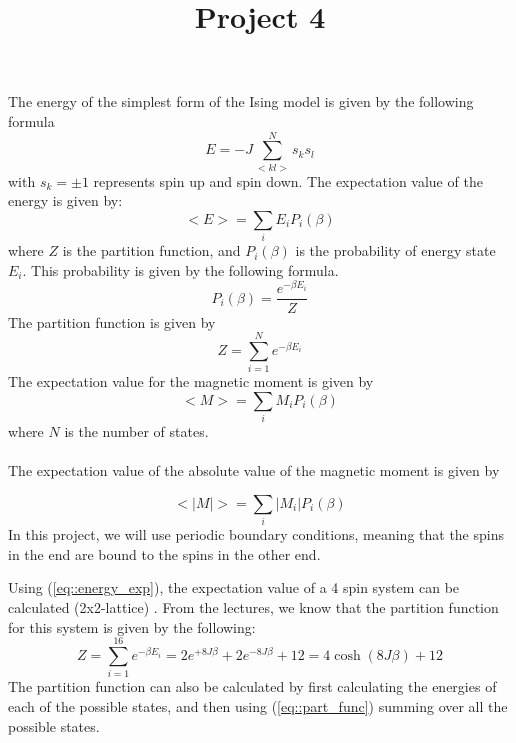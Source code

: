 \documentclass[12pt]{article}
\title{Project 4}
\begin{document}
\maketitle
The energy of the simplest form of the Ising model is given by the following formula
\begin{equation}\label{eq::energy}
E = -J\sum_{<kl>}^{N}s_ks_l
\end{equation}
with $s_k = \pm 1$ represents spin up and spin down. 
The expectation value of the energy is given by:
\begin{equation}\label{eq::energy_exp}
<E> = \sum_i E_i P_i(\beta)
\end{equation}
where $Z$ is the partition function, and $P_i(\beta)$ is the probability of energy state $E_i$. This probability is given by the following formula.
\begin{equation}\label{eq::prob}
P_i(\beta) = \frac{e^{-\beta E_i}}{Z}
\end{equation} 
The partition function is given by 
\begin{equation}\label{eq::part_func}
Z = \sum_{i=1}^{N} e^{-\beta E_i}
\end{equation}
The expectation value for the magnetic moment is given by 
\begin{equation}\label{eq::mag_mom_exp}
<M> = \sum_i M_i P_i(\beta)
\end{equation}
where $N$ is the number of states. 
\\
\\
The expectation value of the absolute value of the magnetic moment is given by 

\begin{equation}\label{eq::abs(mag_mom_exp)}
<|M|> = \sum_i |M_i| P_i(\beta)
\end{equation}
In this project, we will use periodic boundary conditions, meaning that the spins in the end are bound to the spins in the other end. 

Using (\ref{eq::energy_exp}), the expectation value of a 4 spin system can be calculated (2x2-lattice) . From the lectures, we know that the partition function for this system is given by the following:
\begin{equation}
Z = \sum_{i=1}^{16}e^{-\beta E_i} = 2e^{+8J\beta} + 2e^{-8J\beta} + 12 = 4\cosh(8J\beta) + 12
\end{equation}
The partition function can also be calculated by first calculating the energies of each of the possible states, and then using (\ref{eq::part_func}) summing over all the possible states. 
\end{document}

